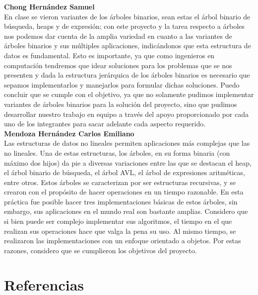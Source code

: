 \documentclass{article}
\begin{document}
\textbf{Chong Hernández Samuel}\\
En clase se vieron variantes de los árboles binarios, sean estas el árbol binario de búsqueda, heaps y de expresión; con este proyecto y la tarea respecto a árboles nos podemos dar cuenta de la amplia variedad en cuanto a las variantes de árboles binarios y sus múltiples aplicaciones, indicándonos que esta estructura de datos es fundamental. Esto es importante, ya que como ingenieros en computación tendremos que idear soluciones para los problemas que se nos presenten y dada la estructura jerárquica de los árboles binarios es necesario que sepamos implementarlos y manejarlos para formular dichas soluciones.
Puedo concluir que se cumple con el objetivo, ya que no solamente pudimos implementar variantes de árboles binarios para la solución del proyecto, sino que pudimos desarrollar nuestro trabajo en equipo a través del apoyo proporcionado por cada uno de los integrantes para sacar adelante cada aspecto requerido.\\

\textbf{Mendoza Hernández Carlos Emiliano}\\
Las estructuras de datos no lineales permiten aplicaciones más complejas que las no lineales. Una de estas estructuras, los árboles, en su forma binaria (con máximo dos hijos) da pie a diversas variaciones entre las que se destacan el heap, el árbol binario de búsqueda, el árbol AVL, el árbol de expresiones aritméticas, entre otros. Estos árboles se caracterizan por ser estructuras recursivas, y se crearon con el propósito de hacer operaciones en un tiempo razonable. En esta práctica fue posible hacer tres implementaciones básicas de estos árboles, sin embargo, sus aplicaciones en el mundo real son bastante amplias. Considero que si bien puede ser complejo implementar sus algoritmos, el tiempo en el que realizan sus operaciones hace que valga la pena su uso. Al mismo tiempo, se realizaron las implementaciones con un enfoque orientado a objetos. Por estas razones, considero que se cumplieron los objetivos del proyecto.

\newpage
\section{Referencias}
\end{document}
